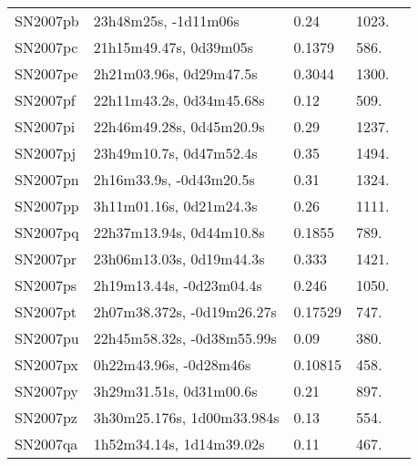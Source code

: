 \begin{longtable}{lllll}
         SN2007pb &           23h48m25s, -1d11m06s &     0.24 &          1023. &    \citet{2007CBET.1128A...1B} \\
         SN2007pc &         21h15m49.47s, 0d39m05s &   0.1379 &           586. &    \citet{2011ApJ...740...92G} \\
         SN2007pe &        2h21m03.96s, 0d29m47.5s &   0.3044 &          1300. &    \citet{2011ApJ...740...92G} \\
         SN2007pf &       22h11m43.2s, 0d34m45.68s &     0.12 &           509. &    \citet{2007CBET.1128A...1B} \\
         SN2007pi &       22h46m49.28s, 0d45m20.9s &     0.29 &          1237. &    \citet{2007CBET.1128A...1B} \\
         SN2007pj &        23h49m10.7s, 0d47m52.4s &     0.35 &          1494. &  \citet{2012AandA...544A..81H} \\
         SN2007pn &        2h16m33.9s, -0d43m20.5s &     0.31 &          1324. &    \citet{2007CBET.1135A...1B} \\
         SN2007pp &        3h11m01.16s, 0d21m24.3s &     0.26 &          1111. &    \citet{2007CBET.1135A...1B} \\
         SN2007pq &       22h37m13.94s, 0d44m10.8s &   0.1855 &           789. &    \citet{2011ApJ...740...92G} \\
         SN2007pr &       23h06m13.03s, 0d19m44.3s &    0.333 &          1421. &    \citet{2011ApJ...740...92G} \\
         SN2007ps &       2h19m13.44s, -0d23m04.4s &    0.246 &          1050. &    \citet{2011ApJ...740...92G} \\
         SN2007pt &     2h07m38.372s, -0d19m26.27s &  0.17529 &           747. &    \citet{2011ApJ...740...92G} \\
         SN2007pu &     22h45m58.32s, -0d38m55.99s &     0.09 &           380. &    \citet{2007CBET.1135A...1B} \\
         SN2007px &         0h22m43.96s, -0d28m46s &  0.10815 &           458. &    \citet{2003SDSS1.C...0000:} \\
         SN2007py &        3h29m31.51s, 0d31m00.6s &     0.21 &           897. &    \citet{2007CBET.1135A...1B} \\
         SN2007pz &     3h30m25.176s, 1d00m33.984s &     0.13 &           554. &    \citet{2007CBET.1135A...1B} \\
         SN2007qa &       1h52m34.14s, 1d14m39.02s &     0.11 &           467. &    \citet{2007CBET.1135A...1B} \\

\end{longtable}
